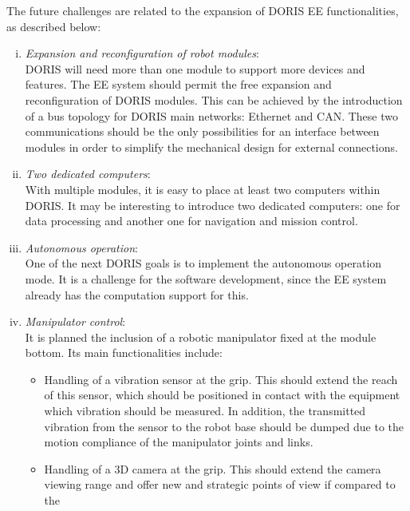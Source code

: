 \documentclass{ifacconf}
\begin{document}
The future challenges are related to the expansion of DORIS EE functionalities,
as described below:
\begin{enumerate}[i)]
  \item \emph{Expansion and reconfiguration of robot modules}:\\
  \newline
  DORIS will need more than one module to support more devices and features.
  The EE system should permit the free expansion and reconfiguration of DORIS
  modules. This can be achieved by the introduction of a bus topology for DORIS
  main networks: Ethernet and CAN. These two communications should be the only
  possibilities for an interface between modules in order to simplify the
  mechanical design for external connections.\\
  \item \emph{Two dedicated computers}:\\
  \newline
  With multiple modules, it is easy to place at least two computers within
  DORIS. It may be interesting to introduce two dedicated computers:  one for
  data processing and another one for navigation and mission control.\\
  \item \emph{Autonomous operation}:\\
  \newline
  One of the next DORIS goals is to implement the autonomous operation mode. It
  is a challenge for the software development, since the EE system already has
  the computation support for this.\\
  \item \emph{Manipulator control}:\\
  \newline
  It is planned the inclusion of a robotic manipulator fixed at the module
  bottom. Its main functionalities include:
  \begin{itemize}
    \item Handling of a vibration sensor at the grip. This should extend the
    reach of this sensor, which should be positioned in contact with the
    equipment which vibration should be measured. In addition, the transmitted
    vibration from the sensor to the robot base should be dumped due to the
    motion compliance of the manipulator joints and links.
    \item Handling of a 3D camera at the grip. This should extend the camera
    viewing range and offer new and strategic points of view if compared to the

\end{itemize}
\end{enumerate}
\end{document}
